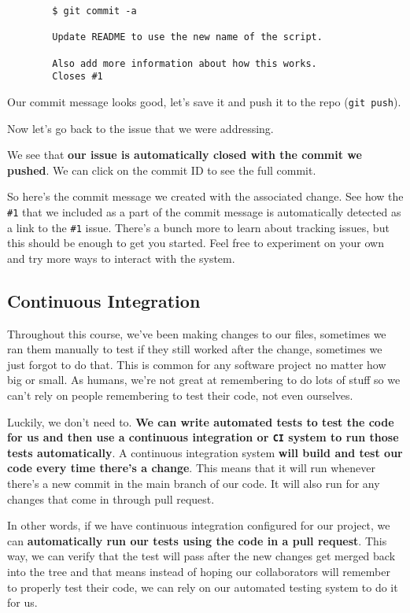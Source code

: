 	\begin{verbatim}
		$ git commit -a
		
		Update README to use the new name of the script.
		
		Also add more information about how this works.
		Closes #1
	\end{verbatim}
	

	Our commit message looks good, let's save it and push it to the repo (\texttt{git push}).

	Now let's go back to the issue that we were addressing.

	We see that \textbf{our issue is automatically closed with the commit we pushed}. We can click on the commit ID to see the full commit.

	So here's the commit message we created with the associated change. See how the \verb|#1| that we included as a part of the commit message is automatically detected as a link to the \verb|#1| issue. There's a bunch more to learn about tracking issues, but this should be enough to get you started. Feel free to experiment on your own and try more ways to interact with the system.
	
	\subsection{Continuous Integration}
	
	
	Throughout this course, we've been making changes to our files, sometimes we ran them manually to test if they still worked after the change, sometimes we just forgot to do that. This is common for any software project no matter how big or small. As humans, we're not great at remembering to do lots of stuff so we can't rely on people remembering to test their code, not even ourselves. 
	
	Luckily, we don't need to. \textbf{We can write automated tests to test the code for us and then use a continuous integration or \texttt{CI} system to run those tests automatically}. A continuous integration system \textbf{will build and test our code every time there's a change}. This means that it will run whenever there's a new commit in the main branch of our code. It will also run for any changes that come in through pull request. 
	
	In other words, if we have continuous integration configured for our project, we can \textbf{automatically run our tests using the code in a pull request}. This way, we can verify that the test will pass after the new changes get merged back into the tree and that means instead of hoping our collaborators will remember to properly test their code, we can rely on our automated testing system to do it for us. 
	
